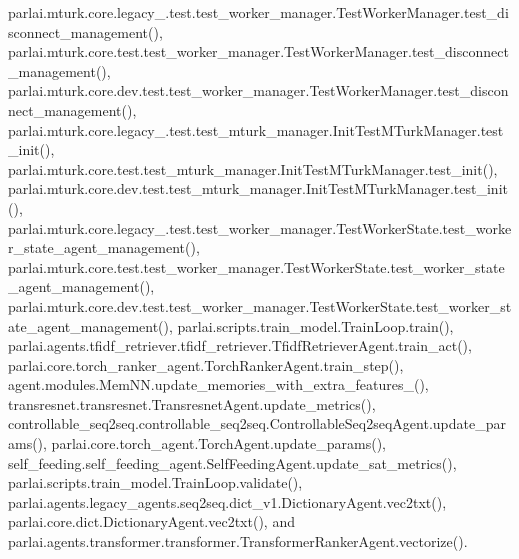 parlai.\+mturk.\+core.\+legacy\+\_.\+test.\+test\+\_\+worker\+\_\+manager.\+Test\+Worker\+Manager.\+test\+\_\+disconnect\+\_\+management(), parlai.\+mturk.\+core.\+test.\+test\+\_\+worker\+\_\+manager.\+Test\+Worker\+Manager.\+test\+\_\+disconnect\+\_\+management(), parlai.\+mturk.\+core.\+dev.\+test.\+test\+\_\+worker\+\_\+manager.\+Test\+Worker\+Manager.\+test\+\_\+disconnect\+\_\+management(), parlai.\+mturk.\+core.\+legacy\+\_.\+test.\+test\+\_\+mturk\+\_\+manager.\+Init\+Test\+M\+Turk\+Manager.\+test\+\_\+init(), parlai.\+mturk.\+core.\+test.\+test\+\_\+mturk\+\_\+manager.\+Init\+Test\+M\+Turk\+Manager.\+test\+\_\+init(), parlai.\+mturk.\+core.\+dev.\+test.\+test\+\_\+mturk\+\_\+manager.\+Init\+Test\+M\+Turk\+Manager.\+test\+\_\+init(), parlai.\+mturk.\+core.\+legacy\+\_.\+test.\+test\+\_\+worker\+\_\+manager.\+Test\+Worker\+State.\+test\+\_\+worker\+\_\+state\+\_\+agent\+\_\+management(), parlai.\+mturk.\+core.\+test.\+test\+\_\+worker\+\_\+manager.\+Test\+Worker\+State.\+test\+\_\+worker\+\_\+state\+\_\+agent\+\_\+management(), parlai.\+mturk.\+core.\+dev.\+test.\+test\+\_\+worker\+\_\+manager.\+Test\+Worker\+State.\+test\+\_\+worker\+\_\+state\+\_\+agent\+\_\+management(), parlai.\+scripts.\+train\+\_\+model.\+Train\+Loop.\+train(), parlai.\+agents.\+tfidf\+\_\+retriever.\+tfidf\+\_\+retriever.\+Tfidf\+Retriever\+Agent.\+train\+\_\+act(), parlai.\+core.\+torch\+\_\+ranker\+\_\+agent.\+Torch\+Ranker\+Agent.\+train\+\_\+step(), agent.\+modules.\+Mem\+N\+N.\+update\+\_\+memories\+\_\+with\+\_\+extra\+\_\+features\+\_\+(), transresnet.\+transresnet.\+Transresnet\+Agent.\+update\+\_\+metrics(), controllable\+\_\+seq2seq.\+controllable\+\_\+seq2seq.\+Controllable\+Seq2seq\+Agent.\+update\+\_\+params(), parlai.\+core.\+torch\+\_\+agent.\+Torch\+Agent.\+update\+\_\+params(), self\+\_\+feeding.\+self\+\_\+feeding\+\_\+agent.\+Self\+Feeding\+Agent.\+update\+\_\+sat\+\_\+metrics(), parlai.\+scripts.\+train\+\_\+model.\+Train\+Loop.\+validate(), parlai.\+agents.\+legacy\+\_\+agents.\+seq2seq.\+dict\+\_\+v1.\+Dictionary\+Agent.\+vec2txt(), parlai.\+core.\+dict.\+Dictionary\+Agent.\+vec2txt(), and parlai.\+agents.\+transformer.\+transformer.\+Transformer\+Ranker\+Agent.\+vectorize().

\mbox{\label{classparlai_1_1agents_1_1legacy__agents_1_1seq2seq_1_1dict__v1_1_1DictionaryAgent_a8a69f5808535e684af929ed4336ab581}} 
